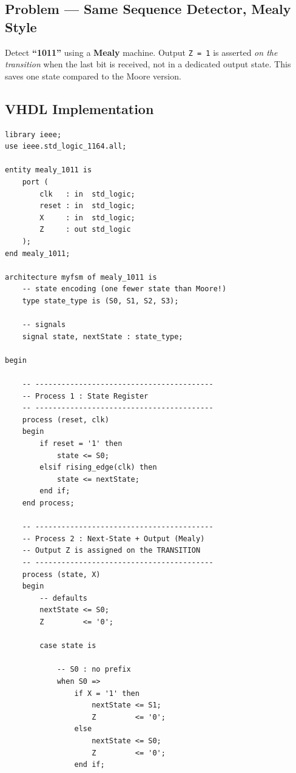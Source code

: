 \documentclass[12pt,a4paper]{article}
\begin{document}
\subsection{Problem --- Same Sequence Detector, Mealy Style}

Detect \textbf{``1011''} using a \textbf{Mealy} machine.
Output \texttt{Z = 1} is asserted \textit{on the transition} when the
last bit is received, not in a dedicated output state.
This saves one state compared to the Moore version.

\subsection{VHDL Implementation}

\begin{tcolorbox}[vhdlbox, title={Level 3 --- mealy\_1011.vhd}]
\begin{lstlisting}[style=vhdlstyle]
library ieee;
use ieee.std_logic_1164.all;

entity mealy_1011 is
    port (
        clk   : in  std_logic;
        reset : in  std_logic;
        X     : in  std_logic;
        Z     : out std_logic
    );
end mealy_1011;

architecture myfsm of mealy_1011 is
    -- state encoding (one fewer state than Moore!)
    type state_type is (S0, S1, S2, S3);

    -- signals
    signal state, nextState : state_type;

begin

    -- -----------------------------------------
    -- Process 1 : State Register
    -- -----------------------------------------
    process (reset, clk)
    begin
        if reset = '1' then
            state <= S0;
        elsif rising_edge(clk) then
            state <= nextState;
        end if;
    end process;

    -- -----------------------------------------
    -- Process 2 : Next-State + Output (Mealy)
    -- Output Z is assigned on the TRANSITION
    -- -----------------------------------------
    process (state, X)
    begin
        -- defaults
        nextState <= S0;
        Z         <= '0';

        case state is

            -- S0 : no prefix
            when S0 =>
                if X = '1' then
                    nextState <= S1;
                    Z         <= '0';
                else
                    nextState <= S0;
                    Z         <= '0';
                end if;


\end{lstlisting}
\end{tcolorbox}
\end{document}
